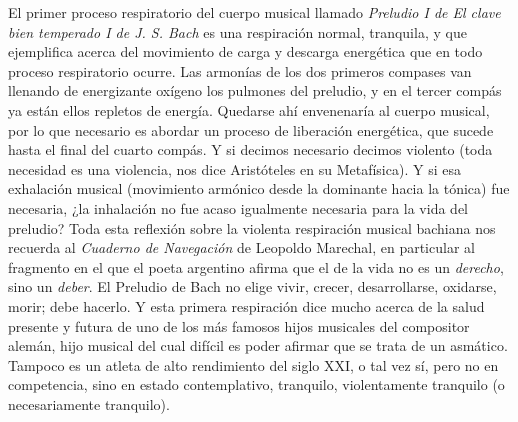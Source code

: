 El primer proceso respiratorio del cuerpo musical llamado \emph{Preludio I de El clave bien temperado I de J. S. Bach} es una respiración normal, tranquila, y que ejemplifica acerca del movimiento de carga y descarga energética que en todo proceso respiratorio ocurre. Las armonías de los dos primeros compases van llenando de energizante oxígeno los pulmones del preludio, y en el tercer compás ya están ellos repletos de energía. Quedarse ahí envenenaría al cuerpo musical, por lo que necesario es abordar un proceso de liberación energética, que sucede hasta el final del cuarto compás. Y si decimos necesario decimos violento (toda necesidad es una violencia, nos dice Aristóteles en su Metafísica). Y si esa exhalación musical (movimiento armónico desde la dominante hacia la tónica) fue necesaria, ¿la inhalación no fue acaso igualmente necesaria para la vida del preludio? Toda esta reflexión sobre la violenta respiración musical bachiana nos recuerda al \emph{Cuaderno de Navegación} de Leopoldo Marechal, en particular al fragmento en el que el poeta argentino afirma que el de la vida no es un \emph{derecho}, sino un \emph{deber}. El Preludio de Bach no elige vivir, crecer, desarrollarse, oxidarse, morir; debe hacerlo. Y esta primera respiración dice mucho acerca de la salud presente y futura de uno de los más famosos hijos musicales del compositor alemán, hijo musical del cual difícil es poder afirmar que se trata de un asmático. Tampoco es un atleta de alto rendimiento del siglo XXI, o tal vez sí, pero no en competencia, sino en estado contemplativo, tranquilo, violentamente tranquilo (o necesariamente tranquilo).
